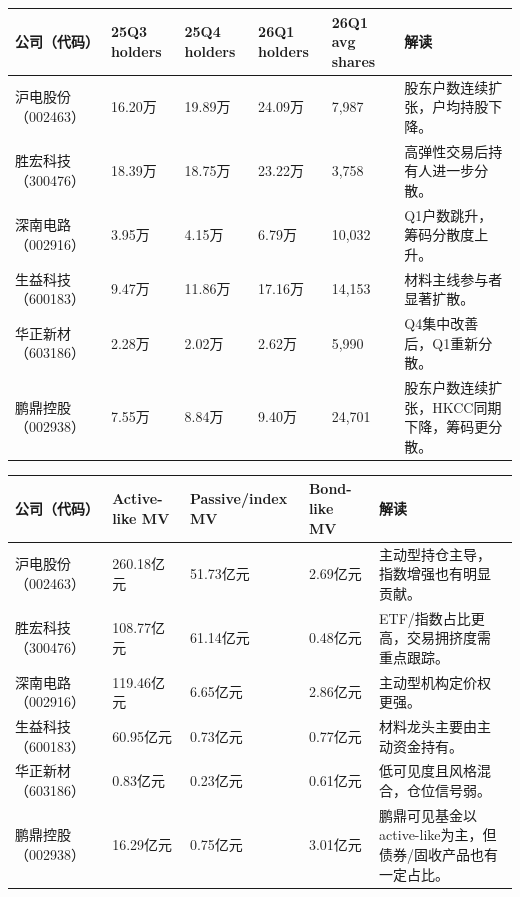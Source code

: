 \begin{exhibitbox}
\footnotesize
\begin{tabularx}{\textwidth}{L{1.8cm}R{1.7cm}R{1.7cm}R{1.7cm}R{1.7cm}X}
\toprule
\textbf{公司（代码）} & \textbf{25Q3 holders} & \textbf{25Q4 holders} & \textbf{26Q1 holders} & \textbf{26Q1 avg shares} & \textbf{解读} \\
\midrule
沪电股份（002463） & 16.20万 & 19.89万 & 24.09万 & 7,987 & 股东户数连续扩张，户均持股下降。 \\
胜宏科技（300476） & 18.39万 & 18.75万 & 23.22万 & 3,758 & 高弹性交易后持有人进一步分散。 \\
深南电路（002916） & 3.95万 & 4.15万 & 6.79万 & 10,032 & Q1户数跳升，筹码分散度上升。 \\
生益科技（600183） & 9.47万 & 11.86万 & 17.16万 & 14,153 & 材料主线参与者显著扩散。 \\
华正新材（603186） & 2.28万 & 2.02万 & 2.62万 & 5,990 & Q4集中改善后，Q1重新分散。 \\
鹏鼎控股（002938） & 7.55万 & 8.84万 & 9.40万 & 24,701 & 股东户数连续扩张，HKCC同期下降，筹码更分散。 \\
\bottomrule
\end{tabularx}
\end{exhibitbox}

\begin{exhibitbox}
\footnotesize
\begin{tabularx}{\textwidth}{L{1.8cm}R{1.8cm}R{1.8cm}R{1.8cm}X}
\toprule
\textbf{公司（代码）} & \textbf{Active-like MV} & \textbf{Passive/index MV} & \textbf{Bond-like MV} & \textbf{解读} \\
\midrule
沪电股份（002463） & 260.18亿元 & 51.73亿元 & 2.69亿元 & 主动型持仓主导，指数增强也有明显贡献。 \\
胜宏科技（300476） & 108.77亿元 & 61.14亿元 & 0.48亿元 & ETF/指数占比更高，交易拥挤度需重点跟踪。 \\
深南电路（002916） & 119.46亿元 & 6.65亿元 & 2.86亿元 & 主动型机构定价权更强。 \\
生益科技（600183） & 60.95亿元 & 0.73亿元 & 0.77亿元 & 材料龙头主要由主动资金持有。 \\
华正新材（603186） & 0.83亿元 & 0.23亿元 & 0.61亿元 & 低可见度且风格混合，仓位信号弱。 \\
鹏鼎控股（002938） & 16.29亿元 & 0.75亿元 & 3.01亿元 & 鹏鼎可见基金以active-like为主，但债券/固收产品也有一定占比。 \\
\bottomrule
\end{tabularx}
\end{exhibitbox}

